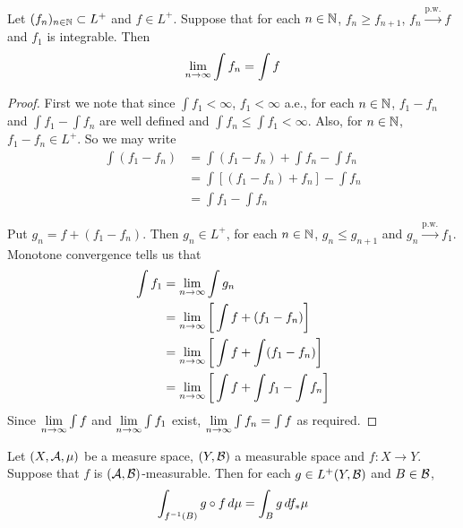 \documentclass{book}
\begin{document}
	\begin{ex} 
		Let $(f_n)_{n \in \mathbb{N}} \subset L^+$ and $f \in L^+$. Suppose that for each $n \in \mathbb{N}$, $f_n \geq f_{n+1}$, $f_n \xrightarrow{\text{p.w.}} f$ and $f_1$ is integrable. Then 
		$$\lim \limits_{n \rightarrow \infty} \int f_n = \int f$$
	\end{ex}
	
	\begin{proof}
		First we note that since $\int f_1 < \infty$, $f_1 < \infty$ a.e., for each $n \in \mathbb{N}$, $f_1 - f_n$ and $\int f_1 - \int f_n$ are well defined and $\int f_n \leq \int f_1 < \infty$. Also, for $n \in \mathbb{N}$, $f_1 -f_n \in L^+$. So we may write 
		\begin{align*}
			\int (f_1 - f_n) 
			&= \int (f_1 - f_n)  + \int f_n - \int f_n\\
			&= \int [(f_1 - f_n) + f_n] - \int f_n\\
			&= \int f_1 - \int f_n
		\end{align*}
		
		Put $g_n = f + (f_1 - f_n)$. Then $g_n \in L^+$, for each $n \in \mathbb{N}$, $g_n \leq g_{n+1}$ and $g_n \xrightarrow{\text{p.w.}} f_1$. Monotone convergence tells us that 
		\begin{align*}
			\int f_1 
			&= \lim \limits_{n \rightarrow \infty} \int g_n\\
			&= \lim \limits_{n \rightarrow \infty} \bigg[\int f + (f_1-f_n)\bigg]\\
			&= \lim \limits_{n \rightarrow \infty} \bigg[ \int f + \int (f_1-f_n)\bigg] \\
			&= \lim \limits_{n \rightarrow \infty} \bigg[ \int f + \int f_1- \int f_n\bigg] 
		\end{align*}
		Since $\lim \limits_{n \rightarrow \infty} \int f$ and $\lim \limits_{n \rightarrow \infty} \int f_1$ exist, $\lim \limits_{n \rightarrow \infty} \int f_n = \int f$ as required.  
	\end{proof}


	\begin{ex} 
		Let $(X, \mathcal{A}, \mu)$ be a measure space, $(Y, \mathcal{B})$ a measurable space and $f: X \rightarrow Y$. Suppose that $f$ is $(\mathcal{A}, \mathcal{B})$-measurable. Then for each $g \in L^+(Y, \mathcal{B})$ and $B \in \mathcal{B}$, 
		$$\int_{f^{-1}(B)} g \circ f \, d \mu = \int_B g \, d f_*\mu$$
	\end{ex}
\end{document}
